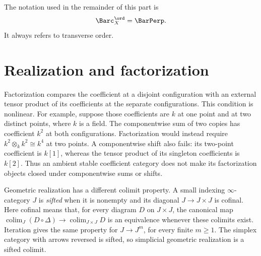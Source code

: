 The notation used in the remainder of this part is
\[
 \Barc_X^{\ord}=\BarPerp.
\]
It always refers to transverse order.

\section{Realization and factorization}

Factorization compares the coefficient at a disjoint configuration with
an external tensor product of its coefficients at the separate configurations.
This condition is nonlinear. For example, suppose those coefficients are
$k$ at one point and at two distinct points, where $k$ is a field.
The componentwise sum of two copies has coefficient $k^2$ at both configurations.
Factorization would instead require $k^2\otimes_k k^2\cong k^4$ at two points.
A componentwise shift also fails: its two-point coefficient is $k[1]$,
whereas the tensor product of its singleton coefficients is $k[2]$.
Thus an ambient stable coefficient category does not make its
factorization objects closed under componentwise sums or shifts.

Geometric realization has a different colimit property.
A small indexing $\infty$-category $J$ is \emph{sifted} when it is nonempty
and its diagonal $J\to J\times J$ is cofinal.
Here cofinal means that, for every diagram $D$ on $J\times J$,
the canonical map $\operatorname*{colim}_{J}(D\circ\Delta)
\to\operatorname*{colim}_{J\times J}D$ is an equivalence whenever these colimits exist.
Iteration gives the same property for $J\to J^m$, for every finite $m\geq1$.
The simplex category with arrows reversed is sifted, so simplicial
geometric realization is a sifted colimit.

